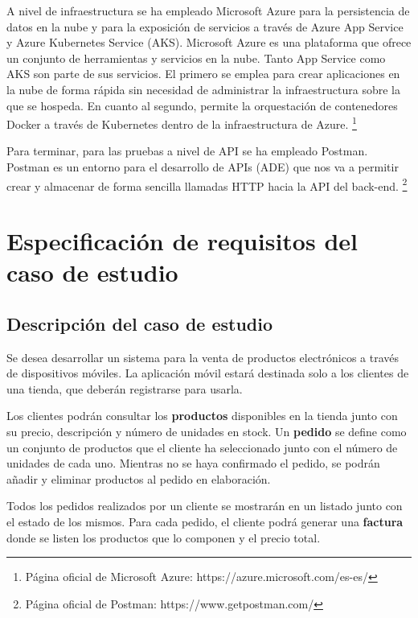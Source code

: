 \documentclass[11pt,spanish,listoffigures]{tfgetsinf}
\begin{document}
A nivel de infraestructura se ha empleado Microsoft Azure para la persistencia de datos en la nube y para la exposición de servicios a través de Azure App Service y Azure Kubernetes Service (AKS). Microsoft Azure es una plataforma que ofrece un conjunto de herramientas y servicios en la nube. Tanto App Service como AKS son parte de sus servicios. El primero se emplea para crear aplicaciones en la nube de forma rápida sin necesidad de administrar la infraestructura sobre la que se hospeda. En cuanto al segundo, permite la orquestación de contenedores Docker a través de Kubernetes dentro de la infraestructura de Azure. \footnote{ Página oficial de Microsoft Azure: https://azure.microsoft.com/es-es/}

Para terminar, para las pruebas a nivel de API se ha empleado Postman. Postman es un entorno para el desarrollo de APIs (ADE) que nos va a permitir crear y almacenar de forma sencilla llamadas HTTP hacia la API del back-end. \footnote{ Página oficial de Postman: https://www.getpostman.com/}


\chapter{Especificación de requisitos del caso de estudio}

\section{Descripción del caso de estudio}

Se desea desarrollar un sistema para la venta de productos electrónicos a través de dispositivos móviles. La aplicación móvil estará destinada solo a los clientes de una tienda, que deberán registrarse para usarla.

Los clientes podrán consultar los \textbf{productos} disponibles en la tienda junto con su precio, descripción y número de unidades en stock. Un \textbf{pedido} se define como un conjunto de productos que el cliente ha seleccionado junto con el número de unidades de cada uno. Mientras no se haya confirmado el pedido, se podrán añadir y eliminar productos al pedido en elaboración.

Todos los pedidos realizados por un cliente se mostrarán en un listado junto con el estado de los mismos. Para cada pedido, el cliente podrá generar una \textbf{factura} donde se listen los productos que lo componen y el precio total.
\end{document}
